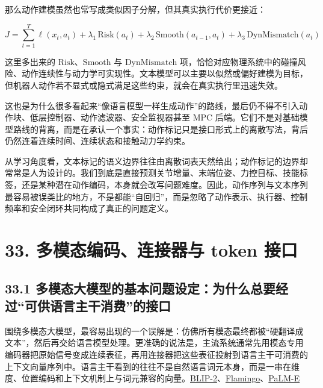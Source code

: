 那么动作建模虽然也常写成类似因子分解，但其真实执行代价更接近：

\begingroup
\scriptsize
\begin{equation*}
J = \sum_{t=1}^{T} \ell(x_t, a_t) + \lambda_1 \, \mathrm{Risk}(a_t) + \lambda_2 \, \mathrm{Smooth}(a_{t-1}, a_t) + \lambda_3 \, \mathrm{DynMismatch}(a_t)
\end{equation*}
\endgroup

这里多出来的 \(\mathrm{Risk}\)、\(\mathrm{Smooth}\) 与 \(\mathrm{DynMismatch}\) 项，恰恰对应物理系统中的碰撞风险、动作连续性与动力学可实现性。文本模型可以主要以似然或偏好建模为目标，但机器人动作若不显式或隐式满足这些约束，就会在真实执行里迅速失效。

这也是为什么很多看起来“像语言模型一样生成动作”的路线，最后仍不得不引入动作块、低层控制器、动作滤波器、安全监视器甚至 MPC 后端。它们不是对基础模型路线的背离，而是在承认一个事实：动作标记只是接口形式上的离散写法，背后仍然连着连续时间、连续状态和接触动力学约束。

从学习角度看，文本标记的语义边界往往由离散词表天然给出；动作标记的边界却常常是人为设计的。我们到底是直接预测关节增量、末端位姿、力控目标、技能标签，还是某种潜在动作编码，本身就会改写问题难度。因此，动作序列与文本序列最容易被误类比的地方，不是都能“自回归”，而是忽略了动作表示、执行器、控制频率和安全闭环共同构成了真正的问题定义。

\section*{33. 多模态编码、连接器与 token 接口}

\subsection*{33.1 多模态大模型的基本问题设定：为什么总要经过“可供语言主干消费”的接口}


围绕多模态大模型，最容易出现的一个误解是：仿佛所有模态最终都被“硬翻译成文本”，然后再交给语言模型处理。更准确的说法是，主流系统通常先用模态专用编码器把原始信号变成连续表征，再用连接器把这些表征投射到语言主干可消费的上下文向量序列中。语言主干看到的往往不是自然语言词元本身，而是一串在维度、位置编码和上下文机制上与词元兼容的向量。\href{https://arxiv.org/abs/2301.12597}{BLIP-2}、\href{https://arxiv.org/abs/2204.14198}{Flamingo}、\href{https://arxiv.org/abs/2303.03378}{PaLM-E}

